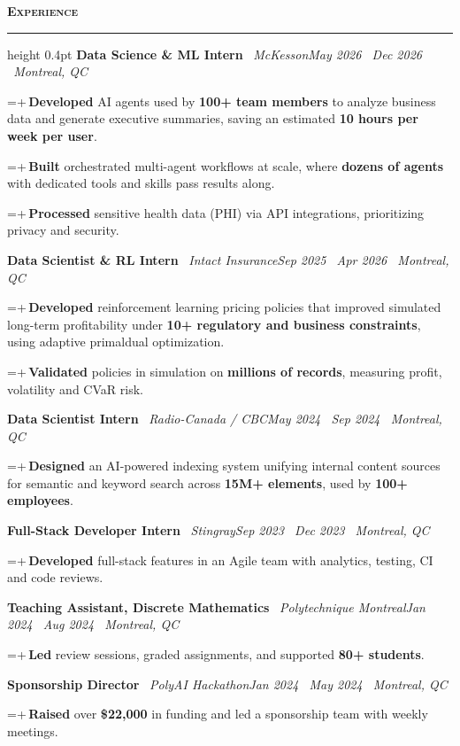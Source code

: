 \documentclass[letterpaper,11pt]{article}
\newcommand{\sep}{\textbar\ }
\newlength{\cvindent}\setlength{\cvindent}{7pt}
\newcommand{\cvsection}[1]{\vspace{9pt}\noindent\textbf{\textsc{#1}}\par\nointerlineskip\vspace{3pt}\hrule height 0.4pt\vspace{7pt}}
\newcommand{\cvrow}[2]{\noindent\hspace{\cvindent}#1\hfill #2\par}
\newlength{\cvbw}
\newcommand{\cvb}[1]{{\fontsize{9.5}{11.4}\selectfont\settowidth{\cvbw}{\textbullet\,}\hangindent=\dimexpr2\cvindent+\cvbw\relax\hangafter=1\noindent\hspace{2\cvindent}\textbullet\,#1\par}}
\newcommand{\cvgap}{\vspace{4pt}}
\begin{document}
\cvsection{Experience}
\cvrow{\textbf{Data Science \& ML Intern} \sep \textit{McKesson}}{\textit{May 2026 \textendash\ Dec 2026 \sep Montreal, QC}}
\cvb{\textbf{Developed} AI agents used by \textbf{100+ team members} to analyze business data and generate executive summaries, saving an estimated \textbf{10 hours per week per user}.}
\cvb{\textbf{Built} orchestrated multi-agent workflows at scale, where \textbf{dozens of agents} with dedicated tools and skills pass results along.}
\cvb{\textbf{Processed} sensitive health data (PHI) via API integrations, prioritizing privacy and security.}
\cvgap
\cvrow{\textbf{Data Scientist \& RL Intern} \sep \textit{Intact Insurance}}{\textit{Sep 2025 \textendash\ Apr 2026 \sep Montreal, QC}}
\cvb{\textbf{Developed} reinforcement learning pricing policies that improved simulated long-term profitability under \textbf{10+ regulatory and business constraints}, using adaptive primal\textendash dual optimization.}
\cvb{\textbf{Validated} policies in simulation on \textbf{millions of records}, measuring profit, volatility and CVaR risk.}
\cvgap
\cvrow{\textbf{Data Scientist Intern} \sep \textit{Radio-Canada / CBC}}{\textit{May 2024 \textendash\ Sep 2024 \sep Montreal, QC}}
\cvb{\textbf{Designed} an AI-powered indexing system unifying internal content sources for semantic and keyword search across \textbf{15M+ elements}, used by \textbf{100+ employees}.}
\cvgap
\cvrow{\textbf{Full-Stack Developer Intern} \sep \textit{Stingray}}{\textit{Sep 2023 \textendash\ Dec 2023 \sep Montreal, QC}}
\cvb{\textbf{Developed} full-stack features in an Agile team with analytics, testing, CI and code reviews.}
\cvgap
\cvrow{\textbf{Teaching Assistant, Discrete Mathematics} \sep \textit{Polytechnique Montreal}}{\textit{Jan 2024 \textendash\ Aug 2024 \sep Montreal, QC}}
\cvb{\textbf{Led} review sessions, graded assignments, and supported \textbf{80+ students}.}
\cvgap
\cvrow{\textbf{Sponsorship Director} \sep \textit{PolyAI Hackathon}}{\textit{Jan 2024 \textendash\ May 2024 \sep Montreal, QC}}
\cvb{\textbf{Raised} over \textbf{\$22,000} in funding and led a sponsorship team with weekly meetings.}
\cvgap
\end{document}
